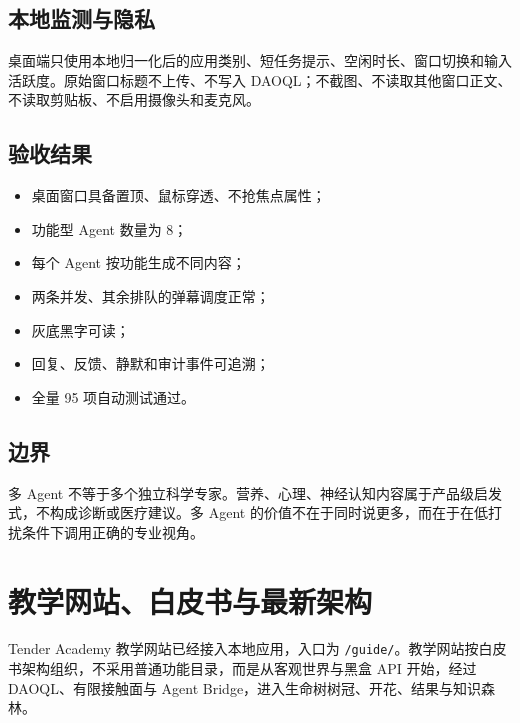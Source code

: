 \documentclass[UTF8,a4paper,11pt]{ctexart}
\begin{document}
\subsection{本地监测与隐私}

桌面端只使用本地归一化后的应用类别、短任务提示、空闲时长、窗口切换和输入活跃度。原始窗口标题不上传、不写入 DAOQL；不截图、不读取其他窗口正文、不读取剪贴板、不启用摄像头和麦克风。

\subsection{验收结果}

\begin{itemize}[leftmargin=2em]
\item 桌面窗口具备置顶、鼠标穿透、不抢焦点属性；
\item 功能型 Agent 数量为 8；
\item 每个 Agent 按功能生成不同内容；
\item 两条并发、其余排队的弹幕调度正常；
\item 灰底黑字可读；
\item 回复、反馈、静默和审计事件可追溯；
\item 全量 95 项自动测试通过。
\end{itemize}

\subsection{边界}

多 Agent 不等于多个独立科学专家。营养、心理、神经认知内容属于产品级启发式，不构成诊断或医疗建议。多 Agent 的价值不在于同时说更多，而在于在低打扰条件下调用正确的专业视角。

\section{教学网站、白皮书与最新架构}

Tender Academy 教学网站已经接入本地应用，入口为 \texttt{/guide/}。教学网站按白皮书架构组织，不采用普通功能目录，而是从客观世界与黑盒 API 开始，经过 DAOQL、有限接触面与 Agent Bridge，进入生命树树冠、开花、结果与知识森林。
\end{document}
